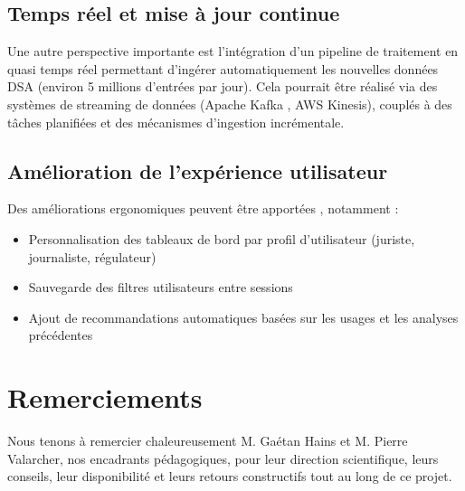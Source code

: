 \documentclass[10pt,twocolumn,a4paper]{article}
\begin{document}
\subsection{Temps réel et mise à jour continue}

Une autre perspective importante est l'intégration d'un pipeline de traitement en quasi temps réel permettant d'ingérer automatiquement les nouvelles données DSA (environ 5 millions d'entrées par jour). Cela pourrait être réalisé via des systèmes de streaming de données (Apache Kafka \cite{nodejs}, AWS Kinesis), couplés à des tâches planifiées et des mécanismes d'ingestion incrémentale.

\subsection{Amélioration de l'expérience utilisateur}

Des améliorations ergonomiques peuvent être apportées \cite{echarts}, notamment :
\begin{itemize}
    \item Personnalisation des tableaux de bord par profil d'utilisateur (juriste, journaliste, régulateur)
    \item Sauvegarde des filtres utilisateurs entre sessions
    \item Ajout de recommandations automatiques basées sur les usages et les analyses précédentes
\end{itemize}

\section*{Remerciements}

Nous tenons à remercier chaleureusement M. Gaétan Hains et M. Pierre Valarcher, nos encadrants pédagogiques, pour leur direction scientifique, leurs conseils, leur disponibilité et leurs retours constructifs tout au long de ce projet.
\end{document}
